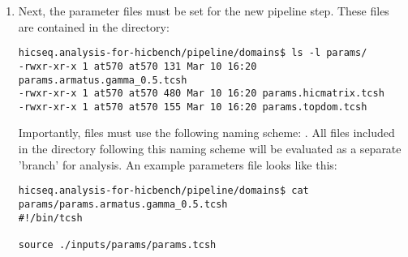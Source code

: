 \begin{enumerate}
\begin{itemize}
\end{itemize}
\item Next, the parameter files must be set for the new pipeline step. These files are contained in the  directory:
\begin{lstlisting}
hicseq.analysis-for-hicbench/pipeline/domains$ ls -l params/
-rwxr-xr-x 1 at570 at570 131 Mar 10 16:20 params.armatus.gamma_0.5.tcsh
-rwxr-xr-x 1 at570 at570 480 Mar 10 16:20 params.hicmatrix.tcsh
-rwxr-xr-x 1 at570 at570 155 Mar 10 16:20 params.topdom.tcsh
\end{lstlisting}
Importantly, files must use the following naming scheme: . All files included in the  directory following this naming scheme will be evaluated as a separate 'branch' for analysis. An example parameters file looks like this:
\begin{lstlisting}
hicseq.analysis-for-hicbench/pipeline/domains$ cat params/params.armatus.gamma_0.5.tcsh
#!/bin/tcsh

source ./inputs/params/params.tcsh


\end{lstlisting}
\end{enumerate}
